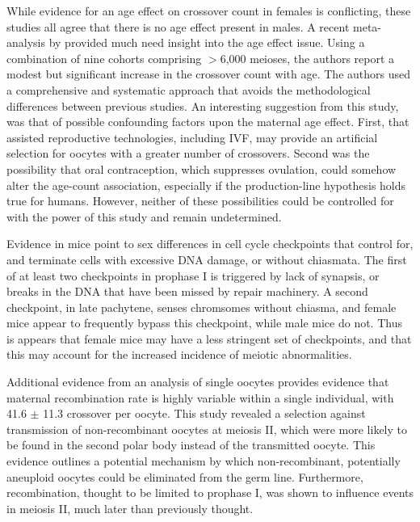 While evidence for an age effect on crossover count in females is conflicting, these studies all agree that there is no age effect present in males.
A recent meta-analysis by \citet{Martin2015} provided much need insight into the age effect issue.
Using a combination of nine cohorts comprising $>$6,000 meioses, the authors report a modest but significant increase in the crossover count with age.
The authors used a comprehensive and systematic approach that avoids the methodological differences between previous studies.
An interesting suggestion from this study, was that of possible confounding factors upon the maternal age effect.
First, that assisted reproductive technologies, including IVF, may provide an artificial selection for oocytes with a greater number of crossovers.
Second was the possibility that oral contraception, which suppresses ovulation, could somehow alter the age-count association, especially if the production-line hypothesis holds true for humans.
However, neither of these possibilities could be controlled for with the power of this study and remain undetermined.

Evidence in mice point to sex differences in cell cycle checkpoints that control for, and terminate cells with excessive DNA damage, or without chiasmata\cite{Cohen2006}.
The first of at least two checkpoints in prophase I is triggered by lack of synapsis, or breaks in the DNA that have been missed by repair machinery.
A second checkpoint, in late pachytene, senses chromsomes without chiasma, and female mice appear to frequently bypass this checkpoint, while male mice do not.
Thus is appears that female mice may have a less stringent set of checkpoints, and that this may account for the increased incidence of meiotic abnormalities\cite{Cohen2006}.

Additional evidence from an analysis of single oocytes provides evidence that maternal recombination rate is highly variable within a single individual, with 41.6 $\pm$ 11.3 crossover per oocyte\cite{Ottolini2015}.
This study revealed a selection against transmission of non-recombinant oocytes at meiosis II, which were more likely to be found in the second polar body instead of the transmitted oocyte.
This evidence outlines a potential mechanism by which non-recombinant, potentially aneuploid oocytes could be eliminated from the germ line.
Furthermore, recombination, thought to be limited to prophase I, was shown to influence events in meiosis II, much later than previously thought.

